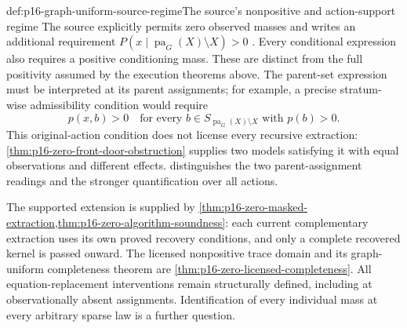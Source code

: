 \begin{proofboundary}{def:p16-graph-uniform-source-regime}{The source's nonpositive and action-support regime}
The source explicitly permits zero observed masses and writes an
additional requirement
\(P(x\mid\operatorname{pa}_G(X)\setminus X)>0\)
\cite[p.~1220 and Lemma~1, p.~1221]{ShpitserPearl2006JointIdentification}.
Every conditional expression also requires a positive conditioning mass.
These are distinct from the full positivity assumed by the execution
theorems above. The parent-set expression must be interpreted at its
parent assignments; for example, a precise stratum-wise admissibility
condition would require
\[
 p(x,b)>0\quad\text{for every }b\in S_{\operatorname{pa}_G(X)\setminus X}
                         \text{ with }p(b)>0.
\]
This original-action condition does not license every recursive
extraction: \cref{thm:p16-zero-front-door-obstruction} supplies two
models satisfying it with equal observations and different effects.
 distinguishes the two
parent-assignment readings and the stronger quantification over all actions.

The supported extension is supplied by
\cref{thm:p16-zero-masked-extraction,thm:p16-zero-algorithm-soundness}:
each current complementary extraction uses its own proved recovery
conditions, and only a complete recovered kernel is passed onward.
The licensed nonpositive trace domain and its graph-uniform
completeness theorem are \cref{thm:p16-zero-licensed-completeness}.
All equation-replacement interventions remain structurally defined,
including at observationally absent assignments. Identification of every
individual mass at every arbitrary sparse law is a further question.
\end{proofboundary}
